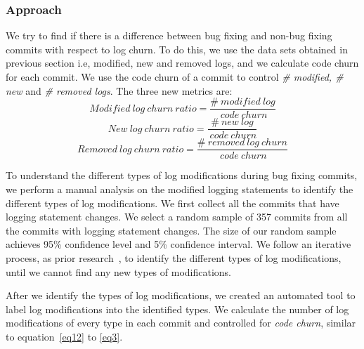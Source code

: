 \documentclass[conference]{IEEEtran}
\providecommand{\DIFadd}[1]{{\protect\color{blue}\uwave{#1}}} %
\providecommand{\DIFaddbegin}{} %
\providecommand{\DIFaddend}{} %
\begin{document}


\subsubsection*{\textbf{Approach}}

We try to find if there is a difference between bug fixing and non-bug fixing commits with respect to log churn. To do this, we use the data sets obtained in previous section i.e, modified, new and removed logs, and we calculate code churn for each commit. We use the \DIFaddbegin \DIFadd{total }\DIFaddend code churn of a commit to control \emph{\# modified, \# new} and \emph{\# removed logs}. The three new metrics are:
\begin{equation}
Modified\ log\ churn\ ratio = \frac{\#\ modified\ log}{\ code\ churn } 
\label{eq12}
\end{equation}
\begin{equation}
New\ log\ churn\ ratio = \frac{\#\ new\ log}{\ code\ churn } 
\label{eq2}
\end{equation}
\begin{equation}
Removed\ log\ churn\ ratio = \frac{\#\ removed\ log\ churn}{\ code\ churn }
\label{eq3} 
\end{equation}


To understand the different types of log modifications during bug fixing commits, we perform a manual analysis on the modified logging statements to identify the different types of log modifications. We first collect all the commits that have logging statement changes. We select a random sample of 357 commits from all the commits with logging statement changes. The size of our random sample achieves 95\% confidence level and 5\% confidence interval. We follow an iterative process, as prior research~\cite{seaman1999qualitative}, to identify the different types of log modifications, until we cannot find any new types of modifications. 

After we identify the types of log modifications, we created an automated tool to label log modifications into the identified types. We calculate the number of log modifications of every type in each commit and 
controlled for {\em code churn}, similar to equation~\ref{eq12} to \ref{eq3}.
\end{document}
